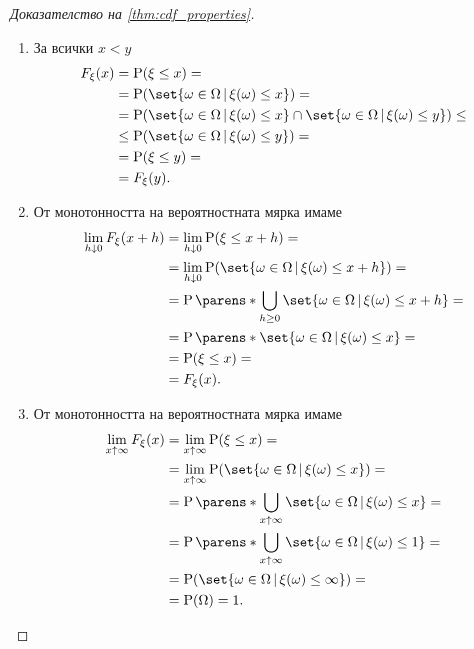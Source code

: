 \documentclass{../../common/topic}
\begin{document}
\begin{proof}[Доказателство на \cref{thm:cdf_properties}]
  \SufficiencySubProof
  \begin{enumerate}
    \item За всички \( x < y \)
    \begin{align*}
      F_\xi(x)
      &=
      \Prob(\xi \leq x)
      = \\ &=
      \Prob(\set{ \omega \in \Omega \given \xi(\omega) \leq x })
      = \\ &=
      \Prob(\set{ \omega \in \Omega \given \xi(\omega) \leq x } \cap \set{ \omega \in \Omega \given \xi(\omega) \leq y })
      \leq \\ &\leq
      \Prob(\set{ \omega \in \Omega \given \xi(\omega) \leq y })
      = \\ &=
      \Prob(\xi \leq y)
      = \\ &=
      F_\xi(y).
    \end{align*}

    \item От монотонността на вероятностната мярка имаме
    \begin{align*}
      \lim_{h \downarrow 0} F_\xi(x + h)
      &=
      \lim_{h \downarrow 0} \Prob(\xi \leq x + h)
      = \\ &=
      \lim_{h \downarrow 0} \Prob(\set{ \omega \in \Omega \given \xi(\omega) \leq x + h })
      = \\ &=
      \Prob\parens*{\bigcup_{h \geq 0} \set{ \omega \in \Omega \given \xi(\omega) \leq x + h }}
      = \\ &=
      \Prob\parens*{\set{ \omega \in \Omega \given \xi(\omega) \leq x }}
      = \\ &=
      \Prob(\xi \leq x)
      = \\ &=
      F_\xi(x).
    \end{align*}

    \item От монотонността на вероятностната мярка имаме
    \begin{align*}
      \lim_{x \uparrow \infty} F_\xi(x)
      &=
      \lim_{x \uparrow \infty} \Prob(\xi \leq x)
      = \\ &=
      \lim_{x \uparrow \infty} \Prob(\set{ \omega \in \Omega \given \xi(\omega) \leq x })
      = \\ &=
      \Prob\parens*{\bigcup_{x \uparrow \infty} \set{ \omega \in \Omega \given \xi(\omega) \leq x }}
      = \\ &=
      \Prob\parens*{\bigcup_{x \uparrow \infty} \set{ \omega \in \Omega \given \xi(\omega) \leq 1 }}
      = \\ &=
      \Prob(\set{ \omega \in \Omega \given \xi(\omega) \leq \infty })
      = \\ &=
      \Prob(\Omega)
      =
      1.
    \end{align*}


\end{enumerate}
\end{proof}
\end{document}
